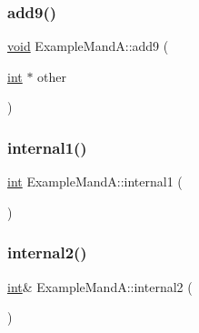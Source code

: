\mbox{\label{class_example_mand_a_af6f2bb08422607b74b287e619a6b1c83}} 
\subsubsection{\texorpdfstring{add9()}{add9()}}
{\footnotesize\ttfamily \mbox{\hyperlink{_s_d_l__opengles2__gl2ext_8h_ae5d8fa23ad07c48bb609509eae494c95}{void}} Example\+Mand\+A\+::add9 (\begin{DoxyParamCaption}\item[{\mbox{\hyperlink{warnings_8h_a74f207b5aa4ba51c3a2ad59b219a423b}{int}} $\ast$}]{other }\end{DoxyParamCaption})\hspace{0.3cm}{\ttfamily [inline]}}

\mbox{\label{class_example_mand_a_a6c5efc5bcb94100af0af0a8d99fe0b81}} 
\subsubsection{\texorpdfstring{internal1()}{internal1()}}
{\footnotesize\ttfamily \mbox{\hyperlink{warnings_8h_a74f207b5aa4ba51c3a2ad59b219a423b}{int}} Example\+Mand\+A\+::internal1 (\begin{DoxyParamCaption}{ }\end{DoxyParamCaption})\hspace{0.3cm}{\ttfamily [inline]}}

\mbox{\label{class_example_mand_a_ab33f9c43ccb72663a9c67b7f0650f338}} 
\subsubsection{\texorpdfstring{internal2()}{internal2()}}
{\footnotesize\ttfamily \mbox{\hyperlink{warnings_8h_a74f207b5aa4ba51c3a2ad59b219a423b}{int}}\& Example\+Mand\+A\+::internal2 (\begin{DoxyParamCaption}{ }\end{DoxyParamCaption})\hspace{0.3cm}{\ttfamily [inline]}}

